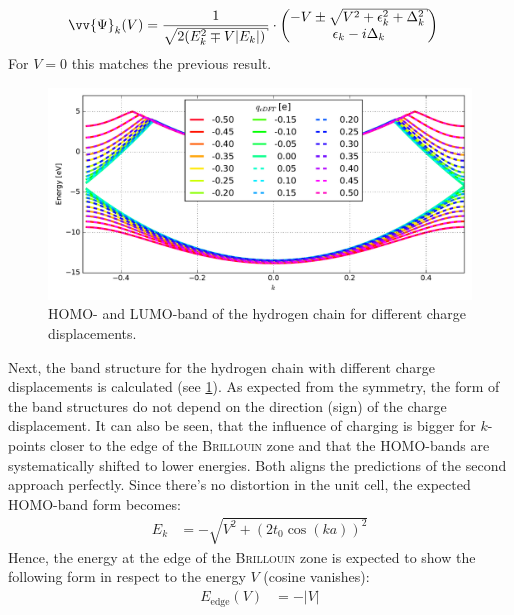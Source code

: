 \begin{align}
\vv{\Psi}_k(V) &= \frac{1}{\sqrt{2\left(E_k^2\mp V|E_k|\right)}}\cdot \begin{pmatrix*}[c]
-V\pm \sqrt{V^2+\epsilon_k^2+\Delta_k^2}\\
\epsilon_k - i \Delta_k
\end{pmatrix*}
\end{align}
For $V=0$ this matches the previous result.\\
\begin{figure}
	\centering
	\includegraphics[width = 13cm]{Images/Hydrogen/charging/band_structure_q_1}
	\caption{HOMO- and LUMO-band of the hydrogen chain for different charge displacements.}
	\label{image_hydrogen_charged_bands}
\end{figure}
Next, the band structure for the hydrogen chain with different charge displacements is calculated (see \cref{image_hydrogen_charged_bands}). As expected from the symmetry, the form of the band structures do not depend on the direction (sign) of the charge displacement. It can also be seen, that the influence of charging is bigger for $k$-points closer to the edge of the \textsc{Brillouin} zone and that the HOMO-bands are systematically shifted to lower energies. Both aligns the predictions of the second approach perfectly.
Since there's no distortion in the unit cell, the expected HOMO-band form becomes:
\begin{align}
E_k &= -\sqrt{V^2 + \left(2t_0\cos(ka)\right)^2}
\end{align}
Hence, the energy at the edge of the \textsc{Brillouin} zone is expected to show the following form in respect to the energy $V$ (cosine vanishes):
\begin{align}
E_\text{edge}(V) &= -\left|V\right|
\end{align}

